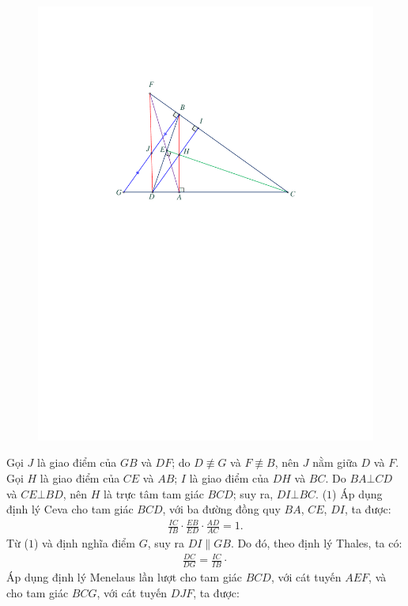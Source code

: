 \begin{multicols}{2}
\begin{figure}[H]
		\includegraphics[width=0.9\linewidth]{P615H1}
		\vspace*{-15pt}
	\end{figure}
	Gọi $J$ là giao điểm của $GB$ và $DF$; do $D \not\equiv G$  và $F \not\equiv B$,  nên $J$ nằm giữa $D$ và $F$.
	\vskip 0.05cm
	Gọi $H$ là giao điểm của $CE$ và $AB$; $I$ là giao điểm của $DH$ và $BC$.
	\vskip 0.05cm
	Do $BA \bot CD$ và $CE \bot BD$, nên $H$ là trực tâm tam giác $BCD$; suy ra, $DI \bot BC$. \hfill                                   ($1$)
	\vskip 0.05cm
	Áp dụng định lý Ceva cho tam giác $BCD$, với ba đường đồng quy $BA$, $CE$, $DI$, ta được:
	\begin{align*}
		\frac{{IC}}{{IB}} \cdot \frac{{EB}}{{ED}} \cdot \frac{{AD}}{{AC}} = 1. \tag{$2$}
	\end{align*}
	Từ ($1$) và định nghĩa điểm $G$, suy ra $DI \parallel GB$. Do đó, theo định lý Thales, ta có:
	\begin{align*}
		\frac{{DC}}{{DG}} = \frac{{IC}}{{IB}} \cdot \tag{$3$}
	\end{align*}
	Áp dụng định lý Menelaus lần lượt cho tam giác $BCD$, với cát tuyến $AEF$, và cho tam giác $BCG$, với cát tuyến $DJF$, ta được:

\end{multicols}
